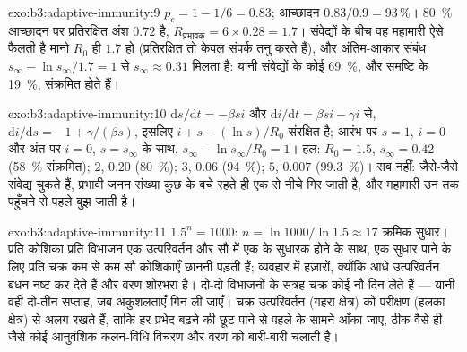 \begin{solution}{exo:b3:adaptive-immunity:9}
$p_{c} = 1 - 1/6 = 0.83$; आच्छादन $0.83/0.9 = 93\,\%$। \qty{80}{\%}
आच्छादन पर प्रतिरक्षित अंश $0.72$ है, $R_{\text{प्रभावक}} = 6\times 0.28
= 1.7$। संवेद्यों के बीच वह महामारी ऐसे फैलती है मानो $R_{0}$ ही
$1.7$ हो (प्रतिरक्षित तो केवल संपर्क तनु करते हैं), और अंतिम-आकार
संबंध $s_{\infty} - \ln s_{\infty}/1.7 = 1$ से $s_{\infty}
\approx 0.31$ मिलता है: यानी संवेद्यों के कोई \qty{69}{\%}, और समष्टि
के \qty{19}{\%}, संक्रमित होते हैं।
\end{solution}

\begin{solution}{exo:b3:adaptive-immunity:10}
$\mathrm{d}s/\mathrm{d}t = -\beta si$ और $\mathrm{d}i/\mathrm{d}t
= \beta si - \gamma i$ से, $\mathrm{d}i/\mathrm{d}s = -1 + \gamma/(\beta s)$,
इसलिए $i + s - (\ln s)/R_{0}$ संरक्षित है; आरंभ पर $s = 1$, $i = 0$
और अंत पर $i = 0$, $s = s_{\infty}$ के साथ, $s_{\infty} - \ln
s_{\infty}/R_{0} = 1$। हल: $R_{0} = 1.5$, $s_{\infty} = 0.42$
(\qty{58}{\%} संक्रमित); $2$, $0.20$ (\qty{80}{\%}); $3$, $0.06$
(\qty{94}{\%}); $5$, $0.007$ (\qty{99.3}{\%})। सब नहीं: जैसे-जैसे
संवेद्य चुकते हैं, प्रभावी जनन संख्या कुछ के बचे रहते ही एक से नीचे
गिर जाती है, और महामारी उन तक पहुँचने से पहले बुझ जाती है।
\end{solution}

\begin{solution}{exo:b3:adaptive-immunity:11}
$1.5^{n} = 1000$: $n = \ln 1000/\ln 1.5 \approx 17$ क्रमिक सुधार।
प्रति कोशिका प्रति विभाजन एक उत्परिवर्तन और सौ में एक के सुधारक होने
के साथ, एक सुधार पाने के लिए प्रति चक्र कम से कम सौ कोशिकाएँ छाननी
पड़ती हैं; व्यवहार में हज़ारों, क्योंकि आधे उत्परिवर्तन बंधन नष्ट कर
देते हैं और वरण शोरभरा है। दो-दो विभाजनों के सत्रह चक्र कोई नौ दिन
लेते हैं --- यानी वही दो-तीन सप्ताह, जब अकुशलताएँ गिन ली जाएँ। चक्र
उत्परिवर्तन (गहरा क्षेत्र) को परीक्षण (हलका क्षेत्र) से अलग रखते हैं,
ताकि हर प्रभेद बढ़ने की छूट पाने से पहले  के सामने आँका जाए,
ठीक वैसे ही जैसे कोई आनुवंशिक कलन-विधि विचरण और वरण को बारी-बारी चलाती
है।
\end{solution}

